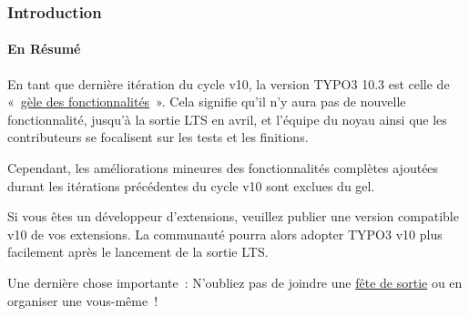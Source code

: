 \begin{frame}[fragile]
	\frametitle{Introduction}
	\framesubtitle{En Résumé}

	\small
		En tant que dernière itération du cycle v10, la version TYPO3 10.3 est celle de
		«~\href{https://typo3.org/article/land-ho-feature-freeze-ahead}{gèle des fonctionnalités}~».
		Cela signifie qu'il n'y aura pas de nouvelle fonctionnalité, jusqu'à la sortie LTS en avril,
		et l'équipe du noyau ainsi que les contributeurs se focalisent sur les tests et les
		finitions.

		\vspace{0.2cm}

		Cependant, les améliorations mineures des fonctionnalités complètes ajoutées durant les itérations
		précédentes du cycle v10 sont exclues du gel.

		\vspace{0.2cm}

		Si vous êtes un développeur d'extensions, veuillez publier une version compatible v10 de vos
		extensions. La communauté pourra alors adopter TYPO3 v10 plus facilement après le lancement
		de la sortie LTS.

		\vspace{0.2cm}

		Une dernière chose importante~: N'oubliez pas de joindre une
		\href{https://typo3.org/community/events/v10-parties}{fête de sortie}
		ou en organiser une vous-même~!

	\normalsize

\end{frame}


